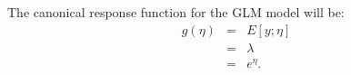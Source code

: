 \begin{answer}
	The canonical response function for the GLM model will be:
	\begin{eqnarray*}
		g(\eta) &=& E[y;\eta]\\
		&=& \lambda\\
		&=& e^\eta.
	\end{eqnarray*}
\end{answer}
